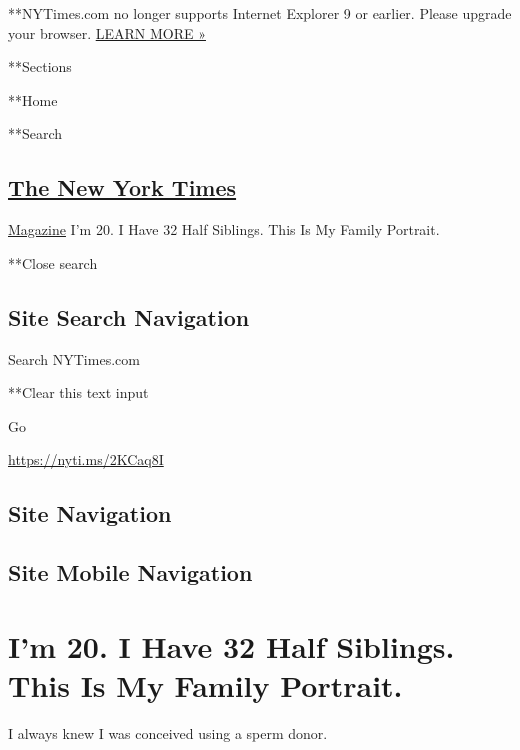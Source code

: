  **NYTimes.com no longer supports Internet Explorer 9 or earlier. Please
upgrade your browser.
\href{http://www.nytimes3xbfgragh.onion/content/help/site/ie9-support.html}{LEARN
MORE »}

**Sections

**Home

**Search

\hypertarget{the-new-york-times}{%
\subsection{\texorpdfstring{\href{http://www.nytimes3xbfgragh.onion/}{The
New York Times}}{The New York Times}}\label{the-new-york-times}}

 \href{https://www.nytimes3xbfgragh.onion/section/magazine}{Magazine}
\textbar{}I'm 20. I Have 32 Half Siblings. This Is My Family Portrait.

**Close search

\hypertarget{site-search-navigation}{%
\subsection{Site Search Navigation}\label{site-search-navigation}}

Search NYTimes.com

**Clear this text input

Go

\url{https://nyti.ms/2KCaq8I}

\hypertarget{site-navigation}{%
\subsection{Site Navigation}\label{site-navigation}}

\hypertarget{site-mobile-navigation}{%
\subsection{Site Mobile Navigation}\label{site-mobile-navigation}}

\hypertarget{im-20-i-have-32-half-siblings-this-is-my-family-portrait}{%
\section{I'm 20. I Have 32 Half Siblings. This Is My Family
Portrait.}\label{im-20-i-have-32-half-siblings-this-is-my-family-portrait}}

I always knew I was conceived using a sperm donor.

